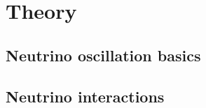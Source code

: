 \chapter{Theory}
\label{chap:theory}

\section{Neutrino oscillation basics}
\label{sec:theory:osc}

\section{Neutrino interactions}
\label{sec:theory:osc}